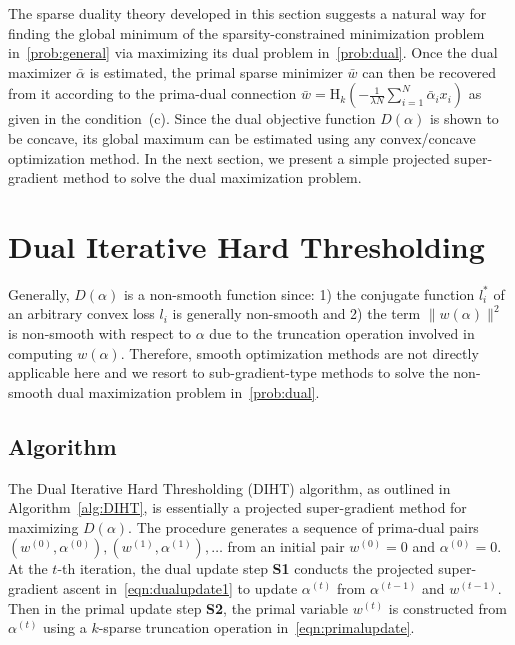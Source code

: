 \documentclass[11pt]{article}
\numberwithin{equation}{section}
\numberwithin{table}{section}
\numberwithin{figure}{section}
\begin{document}
The sparse duality theory developed in this section suggests a natural way for finding the global minimum of the sparsity-constrained minimization problem in~\eqref{prob:general} via maximizing its dual problem in~\eqref{prob:dual}. Once the dual maximizer $\bar\alpha$ is estimated, the primal sparse minimizer $\bar w$ can then be recovered from it according to the prima-dual connection $\bar w = \mathrm{H}_k\left(-\frac{1}{\lambda N}\sum_{i=1}^N \bar\alpha_i x_i\right)$ as given in the condition~(c). Since the dual objective function $D(\alpha)$ is shown to be concave, its global maximum can be estimated using any convex/concave optimization method. In the next section, we present a simple projected super-gradient method to solve the dual maximization problem.

\section{Dual Iterative Hard Thresholding}
\label{sect:algorithm}
Generally, $D(\alpha)$ is a non-smooth function since: 1) the conjugate function $l^*_i$ of an arbitrary convex loss $l_i$ is generally non-smooth and 2) the term $\|w(\alpha)\|^2$ is non-smooth with respect to $\alpha$ due to the truncation operation involved in computing $w(\alpha)$. Therefore, smooth optimization methods are not directly applicable here and we resort to sub-gradient-type methods to solve the non-smooth dual maximization problem in~\eqref{prob:dual}.

\subsection{Algorithm}
The Dual Iterative Hard Thresholding (DIHT) algorithm, as outlined in Algorithm~\ref{alg:DIHT}, is essentially a projected super-gradient method for maximizing $D(\alpha)$. The procedure generates a sequence of prima-dual pairs $(w^{(0)},\alpha^{(0)}), (w^{(1)},\alpha^{(1)}), \ldots$ from an
initial pair $w^{(0)}=0$ and $\alpha^{(0)}=0$. At the $t$-th iteration, the dual update step \textbf{S1} conducts the projected super-gradient ascent in~\eqref{eqn:dualupdate1} to update $\alpha^{(t)}$ from $\alpha^{(t-1)}$ and $w^{(t-1)}$. Then in the primal update step \textbf{S2}, the primal variable $w^{(t)}$ is constructed from $\alpha^{(t)}$ using a $k$-sparse truncation operation in~\eqref{eqn:primalupdate}.
\end{document}
